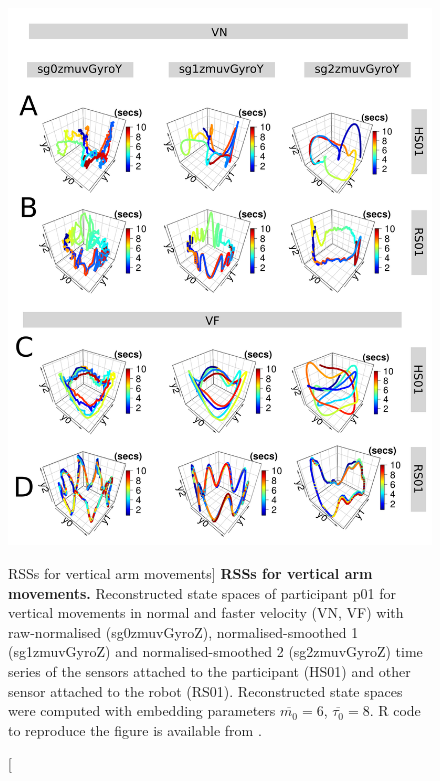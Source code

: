 \begin{figure}
\centering
\includegraphics[height=0.85\textheight]{fig_6_05}
    \caption
	[RSSs for vertical arm movements]{
	{\bf RSSs for vertical arm movements.}
	Reconstructed state spaces %
	of participant p01 for vertical movements in normal and faster 
	velocity (VN, VF) with raw-normalised (sg0zmuvGyroZ), 
	normalised-smoothed 1 (sg1zmuvGyroZ) and 
	normalised-smoothed 2 (sg2zmuvGyroZ) time series of the 
	sensors attached to the participant (HS01) and other sensor 
	attached to the robot (RS01).	
	Reconstructed state spaces were computed with 
	embedding parameters $\overline{m_0}=6$, $\overline{\tau_0}=8$.
	R code to reproduce the figure is available from \cite{xochicale2018}.
        }
    \label{fig:rss_aVw10}
\end{figure}

